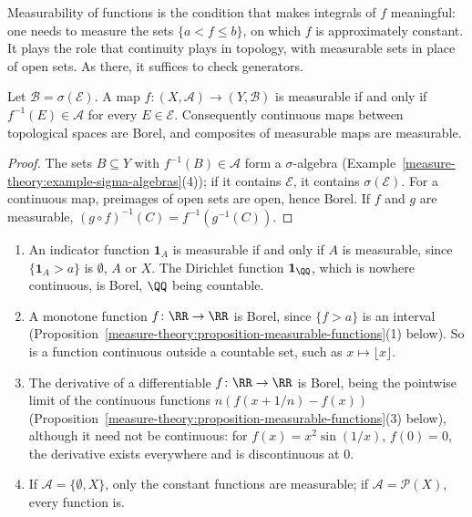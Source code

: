Measurability of functions is the condition that makes integrals of $f$ meaningful: one needs to measure the sets $\{a < f \leq b\}$, on which $f$ is approximately constant. It plays the role that
continuity plays in topology, with measurable sets in place of open sets. As there, it suffices to check generators.

\begin{lemma}\label{measure-theory:lemma-measurable-generators}
Let $\mathcal{B} = \sigma(\mathcal{E})$. A map $f \colon (X, \mathcal{A}) \to (Y, \mathcal{B})$ is measurable if and only if $f^{-1}(E) \in \mathcal{A}$ for every $E \in \mathcal{E}$. Consequently continuous
maps between topological spaces are Borel, and composites of measurable maps are measurable.
\end{lemma}

\begin{proof}
The sets $B \subseteq Y$ with $f^{-1}(B) \in \mathcal{A}$ form a $\sigma$-algebra (Example~\ref{measure-theory:example-sigma-algebras}(4)); if it contains $\mathcal{E}$, it contains $\sigma(\mathcal{E})$. For a
continuous map, preimages of open sets are open, hence Borel. If $f$ and $g$ are measurable, $(g \circ f)^{-1}(C) = f^{-1}(g^{-1}(C))$.
\end{proof}

\begin{example}\label{measure-theory:example-measurable-functions}
\begin{enumerate}
\item An indicator function $\mathbf{1}_A$ is measurable if and only if $A$ is measurable, since $\{\mathbf{1}_A > a\}$ is $\emptyset$, $A$ or $X$. The Dirichlet function $\mathbf{1}_\QQ$, which is nowhere
continuous, is Borel, $\QQ$ being countable.
\item A monotone function $f \colon \RR \to \RR$ is Borel, since $\{f > a\}$ is an interval (Proposition~\ref{measure-theory:proposition-measurable-functions}(1) below). So is a function continuous outside
a countable set, such as $x \mapsto \lfloor x\rfloor$.
\item The derivative of a differentiable $f \colon \RR \to \RR$ is Borel, being the pointwise limit of the continuous functions $n(f(x + 1/n) - f(x))$
(Proposition~\ref{measure-theory:proposition-measurable-functions}(3) below), although it need not be continuous: for $f(x) = x^2\sin(1/x)$, $f(0) = 0$, the derivative exists everywhere and is discontinuous at $0$.
\item If $\mathcal{A} = \{\emptyset, X\}$, only the constant functions are measurable; if $\mathcal{A} = \mathcal{P}(X)$, every function is.
\end{enumerate}
\end{example}

